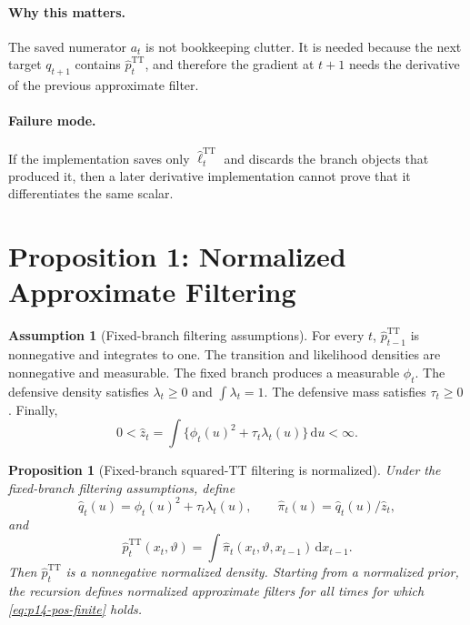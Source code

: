 \documentclass[11pt]{article}
\newcommand{\dd}{\mathrm{d}}
\newcommand{\TT}{\mathrm{TT}}
\renewcommand{\[}{\begin{equation}}
\renewcommand{\]}{\end{equation}}
\newtheorem{proposition}{Proposition}
\theoremstyle{definition}
\newtheorem{assumption}{Assumption}
\theoremstyle{remark}
\begin{document}
\paragraph{Why this matters.}
The saved numerator \(a_t\) is not bookkeeping clutter.  It is needed because
the next target \(q_{t+1}\) contains \(\widehat p_t^{\TT}\), and therefore the
gradient at \(t+1\) needs the derivative of the previous approximate filter.

\paragraph{Failure mode.}
If the implementation saves only \(\widehat\ell_t^{\TT}\) and discards the
branch objects that produced it, then a later derivative implementation cannot
prove that it differentiates the same scalar.

\section{Proposition 1: Normalized Approximate Filtering}

\begin{assumption}[Fixed-branch filtering assumptions]
For every \(t\), \(\widehat p_{t-1}^{\TT}\) is nonnegative and integrates to
one.  The transition and likelihood densities are nonnegative and measurable.
The fixed branch produces a measurable \(\phi_t\).  The defensive density
satisfies \(\lambda_t\ge0\) and \(\int\lambda_t=1\).  The defensive mass
satisfies \(\tau_t\ge0\).  Finally,
\[
  0<
  \widehat z_t
  =
  \int\{\phi_t(u)^2+\tau_t\lambda_t(u)\}\,\dd u
  <\infty.
  \label{eq:p14-pos-finite}
\]
\end{assumption}

\begin{proposition}[Fixed-branch squared-TT filtering is normalized]
Under the fixed-branch filtering assumptions, define
\[
  \widehat q_t(u)=\phi_t(u)^2+\tau_t\lambda_t(u),
  \qquad
  \widehat\pi_t(u)=\widehat q_t(u)/\widehat z_t,
  \label{eq:p14-prop1-joint}
\]
and
\[
  \widehat p_t^{\TT}(x_t,\vartheta)
  =
  \int
  \widehat\pi_t(x_t,\vartheta,x_{t-1})\,\dd x_{t-1}.
  \label{eq:p14-prop1-marginal}
\]
Then \(\widehat p_t^{\TT}\) is a nonnegative normalized density.  Starting
from a normalized prior, the recursion defines normalized approximate filters
for all times for which \eqref{eq:p14-pos-finite} holds.
\end{proposition}
\end{document}
